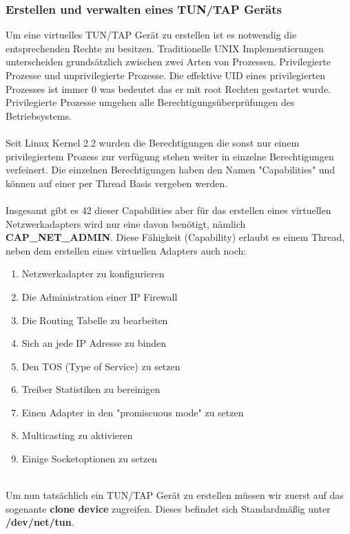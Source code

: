 \subsubsection{Erstellen und verwalten eines TUN/TAP Geräts}
Um eine virtuelles TUN/TAP Gerät zu erstellen ist es notwendig die entsprechenden Rechte zu besitzen. Traditionelle UNIX Implementierungen unterscheiden grundsätzlich zwischen zwei Arten von Prozessen. Privilegierte Prozesse und unprivilegierte Prozesse. Die effektive UID eines privilegierten Prozesses ist immer 0 was bedeutet das er mit root Rechten gestartet wurde. Privilegierte Prozesse umgehen alle Berechtigungsüberprüfungen des Betriebsystems. 
\\\\
Seit Linux Kernel 2.2 wurden die Berechtigungen die sonst nur einem privilegiertem Prozess zur verfügung stehen weiter in einzelne Berechtigungen verfeinert. Die einzelnen Berechtigungen haben den Namen "Capabilities" und können auf einer per Thread Basis vergeben werden.
\\\\
Insgesamt gibt es 42 dieser Capabilities aber für das erstellen eines virtuellen Netzwerkadapters wird nur eine davon benötigt, nämlich \textbf{CAP\_NET\_ADMIN}. Diese Fähigkeit (Capability) erlaubt es einem Thread, neben dem erstellen eines virtuellen Adapters auch noch:
\\
\begin{enumerate}
    \item Netzwerkadapter zu konfigurieren
    \item Die Administration einer IP Firewall
    \item Die Routing Tabelle zu bearbeiten
    \item Sich an jede IP Adresse zu binden
    \item Den TOS (Type of Service) zu setzen 
    \item Treiber Statistiken zu bereinigen
    \item Einen Adapter in den "promiscuous mode" zu setzen
    \item Multicasting zu aktivieren
    \item Einige Socketoptionen zu setzen
\end{enumerate} 
\ \\
Um nun tatsächlich ein TUN/TAP Gerät zu erstellen müssen wir zuerst auf das sogenante \textbf{clone device} zugreifen. Dieses befindet sich Standardmäßig unter \textbf{/dev/net/tun}.
